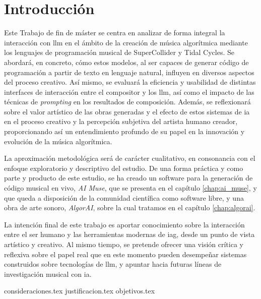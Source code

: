 \chapter{Introducción}



Este Trabajo de fin de máster se centra en analizar de forma integral la interacción con \gls{llm} en el ámbito de la creación de música algorítmica mediante los lenguajes de programación musical de SuperCollider y Tidal Cycles. Se abordará, en concreto, cómo estos modelos, al ser capaces de generar código de programación a partir de texto en lenguaje natural, influyen en diversos aspectos del proceso creativo. Así mismo, se evaluará la eficiencia y usabilidad de distintas interfaces de interacción entre el compositor y los \gls{llm}, así como el impacto de las técnicas de \emph{prompting} en los resultados de composición. Además, se reflexionará sobre el valor artístico de las obras generadas y el efecto de estos sistemas de \gls{ia} en el proceso creativo y la percepción subjetiva del artista humano creador, proporcionando así un entendimiento profundo de su papel en la innovación y evolución de la música algorítmica.

La aproximación metodológica será de carácter cualitativo, en consonancia con el enfoque exploratorio y descriptivo del estudio. De una forma práctica y como parte y producto de este estudio, se ha creado un software para la generación de código musical en vivo, \emph{AI Muse}, que se presenta en el capítulo \ref{chap:ai_muse}, y que queda a disposición de la comunidad científica como software libre, y una obra de arte sonoro, \emph{AlgorAI}, sobre la cual tratamos en el capítulo \ref{chap:algorai}.

La intención final de este trabajo es aportar conocimiento sobre la interacción entre el ser humano y las herramientas modernas de \gls{iag}, desde un punto de vista artístico y creativo. Al mismo tiempo, se pretende ofrecer una visión crítica y reflexiva sobre el papel real que en este momento pueden desempeñar sistemas construidos sobre tecnologías de \gls{llm}, y apuntar hacia futuras líneas de investigación musical con \gls{ia}.



{consideraciones.tex}
{justificacion.tex}
{objetivos.tex}